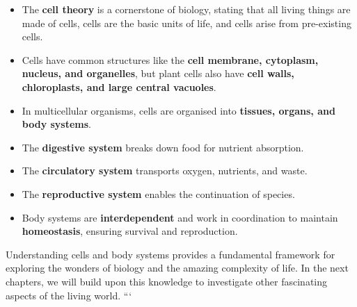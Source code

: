 \begin{itemize}
    \item The \textbf{cell theory} is a cornerstone of biology, stating that all living things are made of cells, cells are the basic units of life, and cells arise from pre-existing cells.
    \item Cells have common structures like the \textbf{cell membrane, cytoplasm, nucleus, and organelles}, but plant cells also have \textbf{cell walls, chloroplasts, and large central vacuoles}.
    \item In multicellular organisms, cells are organised into \textbf{tissues, organs, and body systems}.
    \item The \textbf{digestive system} breaks down food for nutrient absorption.
    \item The \textbf{circulatory system} transports oxygen, nutrients, and waste.
    \item The \textbf{reproductive system} enables the continuation of species.
    \item Body systems are \textbf{interdependent} and work in coordination to maintain \textbf{homeostasis}, ensuring survival and reproduction.
\end{itemize}

Understanding cells and body systems provides a fundamental framework for exploring the wonders of biology and the amazing complexity of life.  In the next chapters, we will build upon this knowledge to investigate other fascinating aspects of the living world.
```
\FloatBarrier
